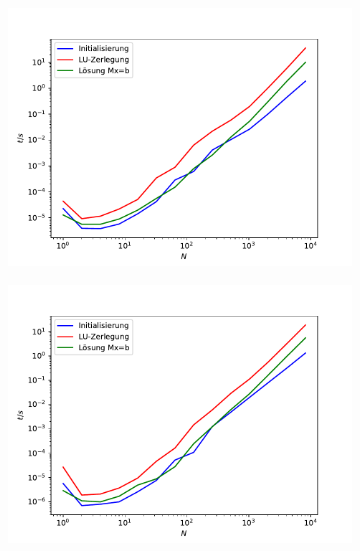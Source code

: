 \documentclass{scrartcl}
\begin{document}
		\begin{figure}[h]
		\centering
		\begin{subfigure}{0.8\textwidth}
		\includegraphics[width=\textwidth]{A2/build/timers.pdf}
		\end{subfigure}
		\begin{subfigure}{0.4\textwidth}
		\includegraphics[width=\textwidth]{build/timers_PC.pdf}
		\end{subfigure}
		\begin{subfigure}{0.4\textwidth}

\end{subfigure}
\end{figure}
\end{document}
